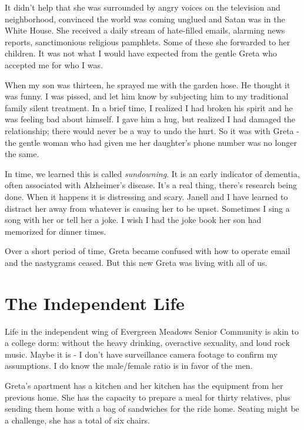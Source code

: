 \documentclass[
  letterpaper,
  DIV=11,
  numbers=noendperiod]{scrreprt}
\begin{document}
It didn't help that she was surrounded by angry voices on the television
and neighborhood, convinced the world was coming unglued and Satan was
in the White House. She received a daily stream of hate-filled emails,
alarming news reports, sanctimonious religious pamphlets. Some of these
she forwarded to her children. It was not what I would have expected
from the gentle Greta who accepted me for who I was.

When my son was thirteen, he sprayed me with the garden hose. He thought
it was funny. I was pissed, and let him know by subjecting him to my
traditional family silent treatment. In a brief time, I realized I had
broken his spirit and he was feeling bad about himself. I gave him a
hug, but realized I had damaged the relationship; there would never be a
way to undo the hurt. So it was with Greta - the gentle woman who had
given me her daughter's phone number was no longer the same.

In time, we learned this is called \emph{sundowning}. It is an early
indicator of dementia, often associated with Alzheimer's disease. It's a
real thing, there's research being done. When it happens it is
distressing and scary. Janell and I have learned to distract her away
from whatever is causing her to be upset. Sometimes I sing a song with
her or tell her a joke. I wish I had the joke book her son had memorized
for dinner times.

Over a short period of time, Greta became confused with how to operate
email and the nastygrams ceased. But this new Greta was living with all
of us.


\chapter*{The Independent Life}\label{the-independent-life}


Life in the independent wing of Evergreen Meadows Senior Community is
akin to a college dorm: without the heavy drinking, overactive
sexuality, and loud rock music. Maybe it is - I don't have surveillance
camera footage to confirm my assumptions. I do know the male/female
ratio is in favor of the men.

Greta's apartment has a kitchen and her kitchen has the equipment from
her previous home. She has the capacity to prepare a meal for thirty
relatives, plus sending them home with a bag of sandwiches for the ride
home. Seating might be a challenge, she has a total of six chairs.
\end{document}
